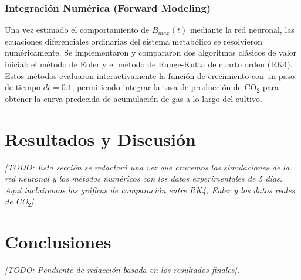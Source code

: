 \documentclass[11pt,a4paper]{article}
\begin{document}
\subsubsection{Integración Numérica (Forward Modeling)}
Una vez estimado el comportamiento de $B_{max}(t)$ mediante la red neuronal, las ecuaciones diferenciales ordinarias del sistema metabólico se resolvieron numéricamente. Se implementaron y compararon dos algoritmos clásicos de valor inicial: el método de Euler y el método de Runge-Kutta de cuarto orden (RK4). Estos métodos evaluaron interactivamente la función de crecimiento con un paso de tiempo $dt = 0.1$, permitiendo integrar la tasa de producción de CO$_2$ para obtener la curva predecida de acumulación de gas a lo largo del cultivo.

\section{Resultados y Discusión}
\textit{[TODO: Esta sección se redactará una vez que crucemos las simulaciones de la red neuronal y los métodos numéricos con los datos experimentales de 5 días. Aquí incluiremos las gráficas de comparación entre RK4, Euler y los datos reales de CO$_2$].}

\section{Conclusiones}
\textit{[TODO: Pendiente de redacción basada en los resultados finales].}
\printbibliography
\end{document}
